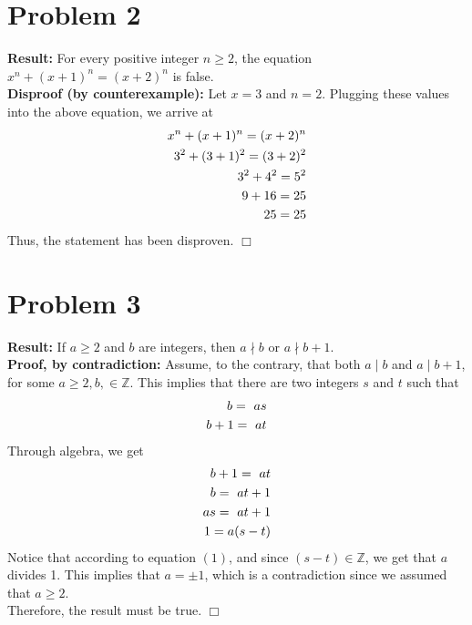 \documentclass[11pt]{article}
\begin{document}
\newpage

\section*{Problem 2}

    \textbf{Result:} For every positive integer $n \geq 2$, the equation $x^n + (x+1)^n = (x+2)^n$ is false. \\
    \textbf{Disproof (by counterexample):} Let $x = 3$ and $n = 2$. Plugging these values into the above equation, we arrive at
    \begin{align}
        x^n + (x+1)^n = (x+2)^n \notag\\
        3^2 + (3+1)^2 = (3+2)^2 \notag\\
        3^2 + 4^2 = 5^2 \notag\\
        9 + 16 = 25 \notag\\
        25 = 25 \notag
    \end{align}
    Thus, the statement has been disproven. \hfill $\Box$

\newpage

\section*{Problem 3}

    \textbf{Result:} If $a \geq 2$ and $b$ are integers, then $a \nmid b$ or $a \nmid b + 1$. \\
    \textbf{Proof, by contradiction:} Assume, to the contrary, that both $a \mid b$ and $a \mid b + 1$, for some $a \geq 2, b, \in \mathbb{Z}$. This implies that there are two integers $s$ and $t$ such that 
    \begin{align}
        b = \ as \notag \\
        b + 1 = \ at \notag
    \end{align}
    Through algebra, we get
    \begin{align}
        b + 1 = \ at \notag \\
        b = \ at + 1 \notag \\
        as = \ at + 1 \notag \\
        1 = a(s-t)
    \end{align}
   Notice that according to equation $(1)$, and since $(s-t) \in \mathbb{Z}$, we get that $a$ divides 1. This implies that $a = \pm 1$, which is a contradiction since we assumed that $a \geq 2$. \\
   Therefore, the result must be true. \hfill $\Box$
\end{document}

